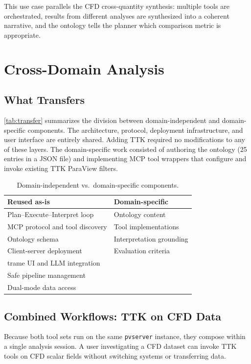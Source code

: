 \documentclass{vgtc}                          %
\begin{document}
This use case parallels the CFD cross-quantity synthesis: multiple tools are
orchestrated, results from different analyses are synthesized into a coherent
narrative, and the ontology tells the planner which comparison metric is
appropriate.


\section{Cross-Domain Analysis}

\subsection{What Transfers}

\autoref{tab:transfer} summarizes the division between domain-independent and
domain-specific components.
The architecture, protocol, deployment infrastructure, and user interface are
entirely shared.
Adding TTK required no modifications to any of these layers.
The domain-specific work consisted of authoring the ontology (25 entries in a
JSON file) and implementing MCP tool wrappers that configure and invoke existing
TTK ParaView filters.

\begin{table}[tb]
  \caption{Domain-independent vs.\ domain-specific components.}
  \label{tab:transfer}
  \centering
  \scriptsize
  \begin{tabular}{ll}
  \toprule
  \textbf{Reused as-is} & \textbf{Domain-specific} \\
  \midrule
  Plan--Execute--Interpret loop & Ontology content \\
  MCP protocol and tool discovery & Tool implementations \\
  Ontology schema & Interpretation grounding \\
  Client-server deployment & Evaluation criteria \\
  trame UI and LLM integration & \\
  Safe pipeline management & \\
  Dual-mode data access & \\
  \bottomrule
  \end{tabular}
\end{table}

\subsection{Combined Workflows: TTK on CFD Data}

Because both tool sets run on the same \texttt{pvserver} instance, they compose
within a single analysis session.
A user investigating a CFD dataset can invoke TTK tools on CFD scalar fields
without switching systems or transferring data.
\end{document}
